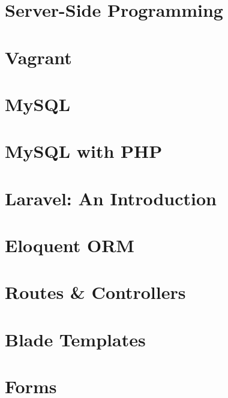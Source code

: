 \documentclass[b5paper,openany]{book}
\begin{document}
\tp


\tableofcontents




\chapter{Server-Side Programming}


\chapter{Vagrant}


\chapter{MySQL}


\chapter{MySQL with PHP}


\chapter{Laravel: An Introduction}


\chapter{Eloquent ORM}


\chapter{Routes \& Controllers}


\chapter{Blade Templates}


\chapter{Forms}

\end{document}
